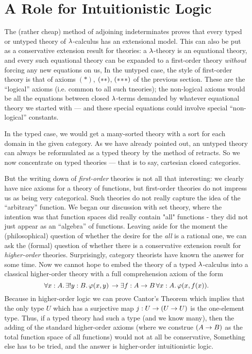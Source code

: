 \section{A Role for Intuitionistic Logic}

The (rather cheap) method of adjoining indeterminates proves that every typed or untyped theory of $\l$-calculus has an extensional model. This can also be put as a conservative extension result for theories: a $\l$-theory is an equational theory, and every such equational theory can be expanded to a first-order theory {\it without} forcing any new equations on us,  In the untyped case, the style of first-order theory is that of axioms $(*)$, $\ss$, $\sss$ of the previous section. These are the ``logical'' axioms (i.e. common to all such tneories); the non-logical axioms would be all the equations between closed $\l$-terms demanded by whatever equational theory we started with --- and these special equations could involve special ``non-logical'' constants.

In the typed case, we would get a many-sorted theory with a sort for each domain in the given category. As we have already pointed out, an untyped theory can always be reformulated as a typed theory by the method of retracts. So we now concentrate on typed theories --- that is to say, cartesian closed categories.

But the writing down of {\it first-order} theories is not all that interesting: we clearly have nice axioms for a theory of functions, but first-order theories do not impress us as being very categorical. Such theories do not really capture the idea of the ``arbitrary'' function. We began our discussion with set theory, where the intention was that function spaces did really contain "all" functions - they did not just appear as an ``algebra'' of functions. Leaving aside for the moment the (philosophical) question of whether the desire for the {\it all} is a rational one, we can ask the (formal) question of whether there is a conservative extension result for {\it higher-order} theories. Surprisingly, category theorists have known the answer for some time.
Now we cannot hope to embed the theory of a typed $\l$-calculus into a classical higher-order theory with a full comprehension axiom of the form
$$
\forall x:A .\,	\exists !y: B .\,  \ffam(x,y)  \, \to  \exists f: \AB \, \forall x: A .\, \ffam(x,f(x)).
$$
Because in higher-order logic we can prove Cantor's Theorem which implies that the only type $U$ which has a surjective map
$j : U \to	\UU$ is the one-element type. Thus, if a typed theory had such a type (and we know many), then the adding of the
standard higher-order axioms (where we construe $(\AB)$ as the total function space of all functions) would not at all be conservative, Something else has to be tried, and the answer is higher-order intuitionistic logic.

